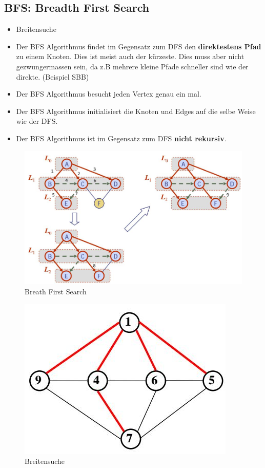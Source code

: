\subsection{BFS: Breadth First Search}
\begin{itemize}
	\item Breitensuche
	\item Der BFS Algorithmus findet im Gegensatz zum DFS den \textbf{direktestens Pfad} zu einem Knoten. Dies ist meist auch der kürzeste. Dies muss aber nicht gezwungermassen sein, da z.B mehrere kleine Pfade schneller sind wie der direkte. (Beispiel SBB)
	\item Der BFS Algorithmus besucht jeden Vertex genau ein mal.
	\item Der BFS Algorithmus initialisiert die Knoten und Edges auf die selbe Weise wie der DFS. 
	\item Der BFS Algorithmus ist im Gegensatz zum DFS \textbf{nicht rekursiv}.
\end{itemize}
\begin{figure}[h]
\centering
\includegraphics[width=0.7\linewidth]{images/bfs_example1}
\caption{Breath First Search}
\label{fig:bfsexample1}
\end{figure}

\begin{figure}[h!]
	\centering
	\includegraphics[width=0.5\linewidth]{images/breath_first}
	\caption{Breitensuche}
	\label{fig:breathfirst}
\end{figure}


